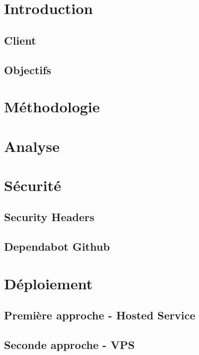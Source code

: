 \documentclass[french, 12pt, a4paper]{article}
\begin{document}

\newpage
{}
\renewcommand{\contentsname}{Table des matières}
\tableofcontents


\newpage
\section{Introduction}
\subsection{Client}
\subsection{Objectifs}

\newpage
\section{Méthodologie}

\newpage
\section{Analyse}

\newpage
\section{Sécurité}
\subsection{Security Headers}
\subsection{Dependabot Github}

\newpage
\section{Déploiement}
\subsection{Première approche - Hosted Service}
\subsection{Seconde approche - VPS}

\newpage
\end{document}
